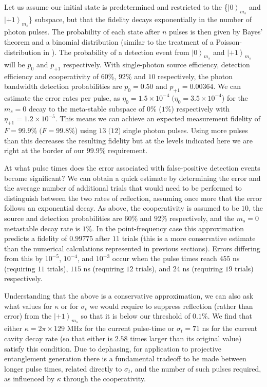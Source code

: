 \documentclass[aps,pra,amsmath,amssymb,reprint,superscriptaddress,tightenlines]{revtex4-1}
\begin{document}
Let us assume our initial state is predetermined and restricted to the \{$\left|0\right>_{m_{s}}$ and $\left|+1\right>_{m_{s}}$\} subspace, but that the fidelity decays exponentially in the number of photon pulses. The probability of each state after $n$ pulses is then given by Bayes' theorem and a binomial distribution (similar to the treatment of a Poisson-distribution in \cite{Sun16}). The probability of a detection event from $\left|0\right>_{m_{s}}$ and $\left|+1\right>_{m_{s}}$ will be $p_{0}$ and $p_{+1}$ respectively. With single-photon source efficiency, detection efficiency and cooperativity of $60$\%, $92$\% and $10$ respectively, the photon bandwidth detection probabilities are $p_{0}=0.50$ and $p_{+1}=0.00364$. We can estimate the error rates per pulse, as $\eta_{0}=1.5\times10^{-4}\; (\eta_{0}=3.5\times10^{-4}$) for the $m_{s}=0$ decay to the meta-stable subspace of $0$\% ($1$\%) respectively with $\eta_{+1}=1.2\times10^{-5}$. This means we can achieve an expected measurement fidelity of $F=99.9\%\; (F=99.8$\%) using $13\;(12$) single photon pulses. Using more pulses than this decreases the resulting fidelity but at the levels indicated here we are right at the border of our $99.9$\% requirement.

At what pulse times does the error associated with false-positive detection events become significant? We can obtain a quick estimate by determining the error and the average number of additional trials that would need to be performed to distinguish between the two rates of reflection, assuming once more that the error follows an exponential decay. As above, the cooperativity is assumed to be $10$, the source and detection probabilities are $60$\% and $92$\% respectively, and the $m_{s}=0$ metastable decay rate is $1$\%. In the point-frequency case this approximation predicts a fidelity of $0.99775$ after $11$ trials (this is a more conservative estimate than the numerical calculations represented in previous sections). Errors differing from this by $10^{-5}$, $10^{-4}$, and $10^{-3}$ occur when the pulse times reach $455$ ns (requiring $11$ trials), $115$ ns (requiring $12$ trials), and $24$ ns (requiring $19$ trials) respectively.

Understanding that the above is a conservative approximation, we can also ask what values for $\kappa$ or for $\sigma_{t}$ we would require to suppress reflection (rather than error) from the $\left|+1\right>_{m_{s}}$ so that it is below our threshold of $0.1$\%. We find that either $\kappa = 2\pi\times 129$ MHz for the current pulse-time or $\sigma_{t}=71$ ns for the current cavity decay rate (so that either is $2.58$ times larger than its original value) satisfy this condition. Due to dephasing, for application to projective entanglement generation there is a fundamental tradeoff to be made between longer pulse times, related directly to $\sigma_{t}$, and the number of such pulses required, as influenced by $\kappa$ through the cooperativity.
\end{document}
